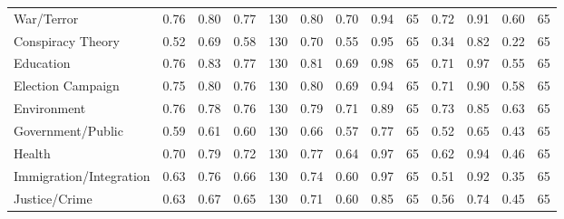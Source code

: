 \begin{longtable}{lrrrlrrrlrrrl}
\bottomrule
\endlastfoot
                        War/Terror &            0.76 &             0.80 &          0.77 &           130 &              0.80 &               0.70 &            0.94 &              65 &              0.72 &               0.91 &            0.60 &              65 \\
                 Conspiracy Theory &            0.52 &             0.69 &          0.58 &           130 &              0.70 &               0.55 &            0.95 &              65 &              0.34 &               0.82 &            0.22 &              65 \\
                         Education &            0.76 &             0.83 &          0.77 &           130 &              0.81 &               0.69 &            0.98 &              65 &              0.71 &               0.97 &            0.55 &              65 \\
                 Election Campaign &            0.75 &             0.80 &          0.76 &           130 &              0.80 &               0.69 &            0.94 &              65 &              0.71 &               0.90 &            0.58 &              65 \\
                       Environment &            0.76 &             0.78 &          0.76 &           130 &              0.79 &               0.71 &            0.89 &              65 &              0.73 &               0.85 &            0.63 &              65 \\
                 Government/Public &            0.59 &             0.61 &          0.60 &           130 &              0.66 &               0.57 &            0.77 &              65 &              0.52 &               0.65 &            0.43 &              65 \\
                            Health &            0.70 &             0.79 &          0.72 &           130 &              0.77 &               0.64 &            0.97 &              65 &              0.62 &               0.94 &            0.46 &              65 \\
           Immigration/Integration &            0.63 &             0.76 &          0.66 &           130 &              0.74 &               0.60 &            0.97 &              65 &              0.51 &               0.92 &            0.35 &              65 \\
                     Justice/Crime &            0.63 &             0.67 &          0.65 &           130 &              0.71 &               0.60 &            0.85 &              65 &              0.56 &               0.74 &            0.45 &              65 \\

\end{longtable}
